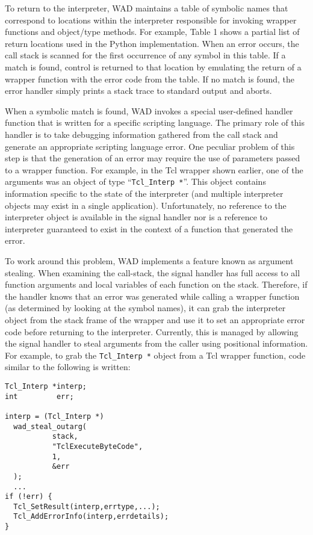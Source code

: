 To return to the interpreter, WAD maintains a table of symbolic names
that correspond to locations within the interpreter
responsible for invoking wrapper functions and object/type methods.
For example, Table 1 shows a partial list of return locations used in
the Python implementation.  When an error occurs, the call stack is
scanned for the first occurrence of any symbol in this table.  If a
match is found, control is returned to that location by emulating the
return of a wrapper function with the error code from the table. If no
match is found, the error handler simply prints a stack trace to
standard output and aborts.

When a symbolic match is found, WAD invokes a special user-defined
handler function that is written for a specific scripting language.
The primary role of this handler is to take debugging information
gathered from the call stack and generate an appropriate scripting
language error.  One peculiar problem of this step is that the
generation of an error may require the use of parameters passed to a
wrapper function.  For example, in the Tcl wrapper shown earlier, one
of the arguments was an object of type ``{\tt Tcl\_Interp *}''.  This
object contains information specific to the state of the interpreter
(and multiple interpreter objects may exist in a single application).
Unfortunately, no reference to the interpreter object is available in the
signal handler nor is a reference to interpreter guaranteed to exist in
the context of a function that generated the error.

To work around this problem, WAD implements a feature
known as argument stealing.  When examining the call-stack, the signal
handler has full access to all function arguments and local variables of each function
on the stack.
Therefore, if the handler knows that an error was generated while
calling a wrapper function (as determined by looking at the symbol names),
it can grab the interpreter object from the stack frame of the wrapper and
use it to set an appropriate error code before returning to the interpreter.
Currently, this is managed by allowing the signal handler to steal
arguments from the caller using positional information.
For example, to grab the {\tt Tcl\_Interp *} object from a Tcl wrapper function,
code similar to the following is written:

\begin{verbatim}
Tcl_Interp *interp;
int         err;

interp = (Tcl_Interp *)
  wad_steal_outarg(
           stack,                
           "TclExecuteByteCode",
           1,
           &err
  );
  ...
if (!err) {
  Tcl_SetResult(interp,errtype,...);
  Tcl_AddErrorInfo(interp,errdetails);
}
\end{verbatim}

